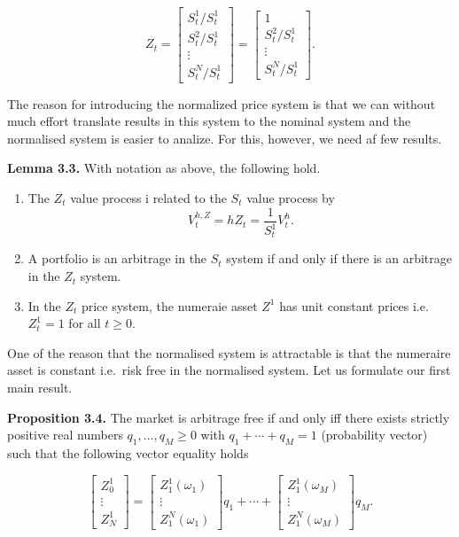 \documentclass[
]{article}
\providecommand{\tightlist}{%
  \setlength{\itemsep}{0pt}\setlength{\parskip}{0pt}}
\begin{document}
\[
Z_t=\begin{bmatrix} S_t^1/S_t^1\\
S_t^2/S_t^1\\
\vdots\\
S_t^N/S_t^1\end{bmatrix}=\begin{bmatrix} 1\\
S_t^2/S_t^1\\
\vdots\\
S_t^N/S_t^1\end{bmatrix}.
\]

The reason for introducing the normalized price system is that we can
without much effort translate results in this system to the nominal
system and the normalised system is easier to analize. For this,
however, we need af few results.

\textbf{Lemma 3.3.} With notation as above, the following hold.

\begin{enumerate}
\def\labelenumi{\arabic{enumi}.}
\tightlist
\item
  The \(Z_t\) value process i related to the \(S_t\) value process by \[
    V_t^{h,Z}=hZ_t=\frac{1}{S_t^1}V_t^h.
    \]
\item
  A portfolio is an arbitrage in the \(S_t\) system if and only if there
  is an arbitrage in the \(Z_t\) system.
\item
  In the \(Z_t\) price system, the numeraie asset \(Z^1\) has unit
  constant prices i.e.~\(Z_t^1=1\) for all \(t\ge 0\).
\end{enumerate}

One of the reason that the normalised system is attractable is that the
numeraire asset is constant i.e.~risk free in the normalised system. Let
us formulate our first main result.

\textbf{Proposition 3.4.} The market is arbitrage free if and only iff
there exists strictly positive real numbers \(q_1,...,q_M\ge 0\) with
\(q_1+\cdots + q_M=1\) (probability vector) such that the following
vector equality holds

\[
\begin{bmatrix} Z_0^1\\
\vdots\\
Z_N^1\end{bmatrix}=\begin{bmatrix} Z_1^1(\omega_1)\\
\vdots\\
Z_1^N(\omega_1)\end{bmatrix}q_1+\cdots +\begin{bmatrix} Z_1^1(\omega_M)\\
\vdots\\
Z_1^N(\omega_M)\end{bmatrix}q_M.\tag{3.3}
\]
\end{document}
